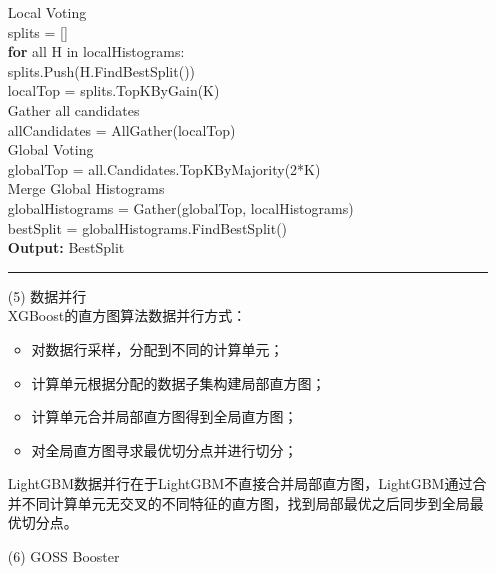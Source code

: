 \documentclass[a4paper]{article}
\begin{document}
\begin{itemize}
						\hspace*{32pt}	Local Voting\\
						\hspace*{32pt}	splits = []\\
						\hspace*{32pt}	\textbf{for} all H in localHistograms:\\
						\hspace*{48pt}  splits.Push(H.FindBestSplit())\\
						\hspace*{32pt}	localTop = splits.TopKByGain(K)\\
						\hspace*{32pt}	Gather all candidates\\
						\hspace*{32pt}	allCandidates = AllGather(localTop)\\
						\hspace*{32pt}	Global Voting\\
						\hspace*{32pt}	globalTop = all.Candidates.TopKByMajority(2*K)\\
						\hspace*{32pt}	Merge Global Histograms\\
						\hspace*{32pt}	globalHistograms = Gather(globalTop, localHistograms)\\
						\hspace*{32pt}	bestSplit = globalHistograms.FindBestSplit()\\
						\textbf{Output:} BestSplit\\
				\noindent\rule[0.10\baselineskip]{\textwidth}{0.75pt}
			\item[(5)] 数据并行\\
				XGBoost的直方图算法数据并行方式：
				\begin{itemize}
					\item 对数据行采样，分配到不同的计算单元；
					\item 计算单元根据分配的数据子集构建局部直方图；
					\item 计算单元合并局部直方图得到全局直方图；
					\item 对全局直方图寻求最优切分点并进行切分；
				\end{itemize}
				LightGBM数据并行在于LightGBM不直接合并局部直方图，LightGBM通过合并不同计算单元无交叉的不同特征的直方图，找到局部最优之后同步到全局最优切分点。
			\item[(6)] GOSS Booster\\

\end{itemize}
\end{document}
